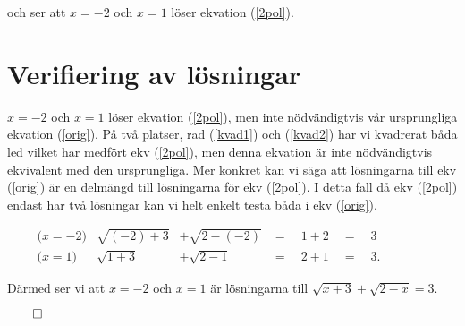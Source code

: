 \documentclass{article}
\begin{document}
och ser att $x = -2$ och $x = 1$ löser ekvation (\ref{2pol}).

\section*{Verifiering av lösningar}

$x = -2$ och $x = 1$ löser ekvation (\ref{2pol}), men inte nödvändigtvis vår ursprungliga ekvation (\ref{orig}). På två platser, rad (\ref{kvad1}) och (\ref{kvad2}) har vi kvadrerat båda led vilket har medfört ekv (\ref{2pol}), men denna ekvation är inte nödvändigtvis ekvivalent med den ursprungliga. Mer konkret kan vi säga att lösningarna till ekv (\ref{orig}) är en delmängd till lösningarna för ekv (\ref{2pol}). I detta fall då ekv (\ref{2pol}) endast har två lösningar kan vi helt enkelt testa båda i ekv (\ref{orig}).

\begin{align*}
  & \text{($x = -2$)}&  \sqrt{(-2) + 3} &+ \sqrt{2 - (-2)} &= \quad 1 + 2 \quad = \quad 3 \quad\quad\quad&&\\
  & \text{($x = 1$)}&  \sqrt{1 + 3}    &+ \sqrt{2 - 1}    &= \quad 2 + 1 \quad =    \quad 3 \text{.}    \quad\quad\quad&&
\end{align*}

Därmed ser vi att $x = -2$ och $x = 1$ är lösningarna till $\sqrt{x + 3} + \sqrt{2 - x} = 3$.

\centerline{$\qed$}
\end{document}
